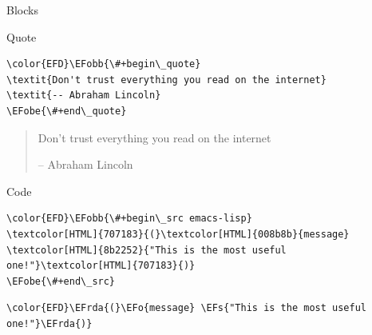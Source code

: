 \documentclass[presentation, t]{beamer}
\newcommand\efstrut{\vrule height 2.1ex depth 0.8ex width 0pt}
\newcommand{\EFs}[1]{\textcolor{EFs}{#1}} %
\newcommand{\EFo}[1]{\textcolor{EFo}{#1}} %
\newcommand{\EFobb}[1]{\colorbox{Efobb}{\efstrut{}\textcolor{EFobb}{#1}}} %
\newcommand{\EFobe}[1]{\colorbox{Efobe}{\efstrut{}\textcolor{EFobe}{#1}}} %
\newcommand{\EFrda}[1]{\textcolor{EFrda}{#1}} %
\begin{document}
\begin{frame}[label={sec:orgabe993c},fragile]{Blocks}
 \begin{block}{Quote}
\begin{Code}
\begin{Verbatim}
\color{EFD}\EFobb{\#+begin\_quote}
\textit{Don't trust everything you read on the internet}
\textit{-- Abraham Lincoln}
\EFobe{\#+end\_quote}
\end{Verbatim}
\end{Code}

\begin{quote}
Don't trust everything you read on the internet

-- Abraham Lincoln
\end{quote}
\end{block}
\begin{block}{Code}
\begin{Code}
\begin{Verbatim}
\color{EFD}\EFobb{\#+begin\_src emacs-lisp}
\textcolor[HTML]{707183}{(}\textcolor[HTML]{008b8b}{message} \textcolor[HTML]{8b2252}{"This is the most useful one!"}\textcolor[HTML]{707183}{)}
\EFobe{\#+end\_src}
\end{Verbatim}
\end{Code}

\begin{Code}
\begin{Verbatim}
\color{EFD}\EFrda{(}\EFo{message} \EFs{"This is the most useful one!"}\EFrda{)}
\end{Verbatim}
\end{Code}
\end{block}
\end{frame}
\end{document}
